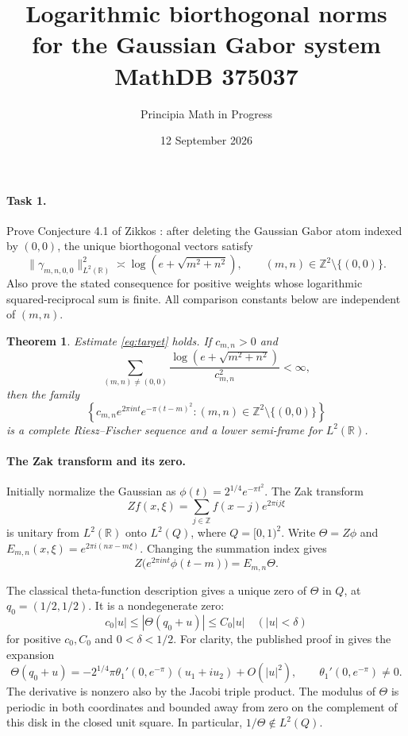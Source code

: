 \documentclass[11pt]{article}
\title{Logarithmic biorthogonal norms for the Gaussian Gabor system\\
\large MathDB 375037}
\author{Principia Math in Progress}
\date{12 September 2026}
\newtheorem{theorem}{Theorem}
\begin{document}
\maketitle

\paragraph{Task 1.}
Prove Conjecture 4.1 of Zikkos \cite{Z}: after deleting the Gaussian Gabor
atom indexed by $(0,0)$, the unique biorthogonal vectors satisfy
\begin{equation}\label{eq:target}
 \|\gamma_{m,n,0,0}\|_{L^2(\mathbb R)}^2
 \asymp\log\!\left(e+\sqrt{m^2+n^2}\right),
 \qquad (m,n)\in\mathbb Z^2\setminus\{(0,0)\}.
\end{equation}
Also prove the stated consequence for positive weights whose
logarithmic squared-reciprocal sum is finite.
All comparison constants below are independent of $(m,n)$.

\begin{theorem}
Estimate \eqref{eq:target} holds. If $c_{m,n}>0$ and
\begin{equation}\label{eq:weights}
 \sum_{(m,n)\ne(0,0)}
 \frac{\log(e+\sqrt{m^2+n^2})}{c_{m,n}^2}<\infty,
\end{equation}
then the family
\[
 \left\{c_{m,n}e^{2\pi int}e^{-\pi(t-m)^2}:
              (m,n)\in\mathbb Z^2\setminus\{(0,0)\}\right\}
\]
is a complete Riesz--Fischer sequence and a lower semi-frame for
$L^2(\mathbb R)$.
\end{theorem}

\paragraph{The Zak transform and its zero.}
Initially normalize the Gaussian as $\phi(t)=2^{1/4}e^{-\pi t^2}$.
The Zak transform
\[
 Zf(x,\xi)=\sum_{j\in\mathbb Z}f(x-j)e^{2\pi ij\xi}
\]
is unitary from $L^2(\mathbb R)$ onto $L^2(Q)$, where $Q=[0,1)^2$.
Write $\Theta=Z\phi$ and
$E_{m,n}(x,\xi)=e^{2\pi i(nx-m\xi)}$. Changing the summation index gives
\begin{equation}\label{eq:covariance}
 Z\big(e^{2\pi int}\phi(t-m)\big)=E_{m,n}\Theta.
\end{equation}

The classical theta-function description gives a unique zero of $\Theta$
in $Q$, at $q_0=(1/2,1/2)$. It is a nondegenerate zero:
\begin{equation}\label{eq:zero}
 c_0|u|\leq|\Theta(q_0+u)|\leq C_0|u|
 \quad (|u|<\delta)
\end{equation}
for positive $c_0,C_0$ and $0<\delta<1/2$.
For clarity, the published proof in \cite[Corollary 4.3, equation (11)]{HHKN}
gives the expansion
\[
 \Theta(q_0+u)
 =-2^{1/4}\pi\theta_1'(0,e^{-\pi})(u_1+iu_2)+O(|u|^2),
 \qquad \theta_1'(0,e^{-\pi})\ne0.
\]
The derivative is nonzero also by the Jacobi triple product.
The modulus of $\Theta$ is periodic in both coordinates and bounded away
from zero on the complement of this disk in the closed unit square.
In particular, $1/\Theta\notin L^2(Q)$.
\end{document}
